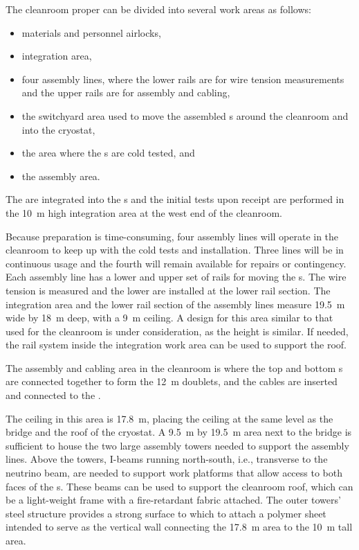 The cleanroom proper can be divided into several work areas as follows:
\begin{itemize}
    \item materials and personnel airlocks,
    \item {} integration area,
    \item four  assembly lines, where the lower rails are for wire tension measurements and the upper rails are for  assembly and cabling,
    \item the switchyard area used to move the assembled s around the cleanroom and into the cryostat,
    \item the \coldbox area where the s are cold tested, and
    \item the  assembly area.
\end{itemize}




The  are integrated into the s and the initial  tests upon receipt are performed in the \SI{10}{m} high  integration area at the west end of the cleanroom. 


Because  preparation
is time-consuming, four assembly lines will operate in the cleanroom to keep up with the cold tests and installation. 
Three lines will be in continuous usage and the fourth will remain available for repairs or contingency. 
Each assembly line has a lower and upper set of rails for moving the s. %
The wire tension is measured and the lower   are installed at the lower rail section.  The  integration area and the lower rail section of the assembly lines measure \SI{19.5}{m} wide by \SI{18}{m} deep, with a \SI{9}{m} ceiling. A design for this area similar to that used for the  cleanroom is under consideration, as the height is similar.  If needed, the rail system inside the integration work area can be used to support the roof.
 
The  assembly and cabling area in the cleanroom is where the top and bottom s are connected together to form the \SI{12}{m}  doublets, and the  cables are inserted and connected to the . 


The ceiling in this area is \SI{17.8}{m}, placing the ceiling at the same level as the bridge and the roof of the cryostat. 
A \SI{9.5}{m} by \SI{19.5}{m} area next to the bridge is sufficient to house the two large assembly towers needed to support the assembly lines. 
Above the towers, I-beams running north-south, i.e., transverse to the neutrino beam, are needed to support work platforms that allow access to both faces of the s. 
These beams can be used to support the cleanroom roof, which can be a light-weight frame with a fire-retardant fabric attached. 
The outer towers' steel structure provides a strong surface to which to attach a polymer sheet intended to serve as the vertical wall connecting the \SI{17.8}{m} area to the \SI{10}{m} tall area.

